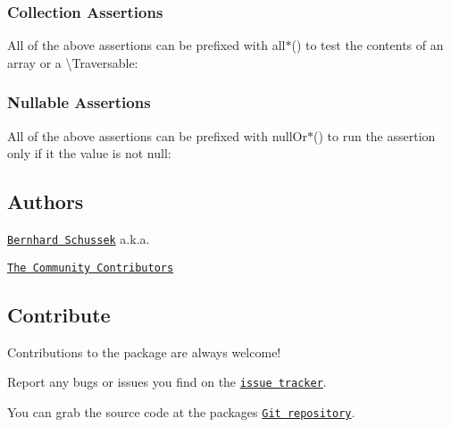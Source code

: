 \subsubsection*{Collection Assertions}

All of the above assertions can be prefixed with {\ttfamily all$\ast$()} to test the contents of an array or a {\ttfamily \textbackslash{}Traversable}\+:




\subsubsection*{Nullable Assertions}

All of the above assertions can be prefixed with {\ttfamily null\+Or$\ast$()} to run the assertion only if it the value is not {\ttfamily null}\+:




\subsection*{Authors }


\begin{DoxyItemize}
\item \href{http://webmozarts.com}{\tt Bernhard Schussek} a.\+k.\+a. \href{https://twitter.com/webmozart}{\tt }
\item \href{https://github.com/webmozart/assert/graphs/contributors}{\tt The Community Contributors}
\end{DoxyItemize}

\subsection*{Contribute }

Contributions to the package are always welcome!


\begin{DoxyItemize}
\item Report any bugs or issues you find on the \href{https://github.com/webmozart/assert/issues}{\tt issue tracker}.
\item You can grab the source code at the package\textquotesingle{}s \href{https://github.com/webmozart/assert}{\tt Git repository}.
\end{DoxyItemize}

